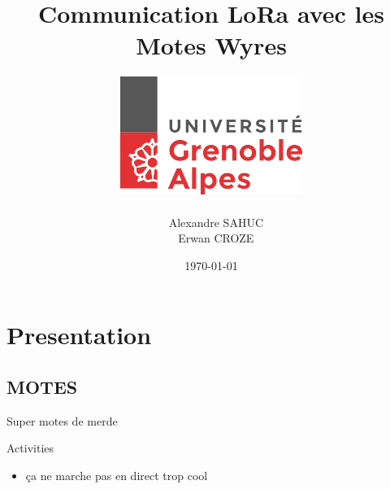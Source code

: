 \documentclass{beamer}
\title{Communication LoRa avec les Motes Wyres}
\author{\includegraphics[scale=0.3]{univ.png} \\~ \\ ~ Alexandre SAHUC\\~ Erwan CROZE}
\institute{Université Joseph Fourier \newline M2M}
\date{\today}
\begin{document}
\begin{frame}
	\titlepage
\end{frame}

\section{Presentation}
\subsection{MOTES}
\begin{frame}
  	\begin{block}{Super motes de merde}
		
	\end{block}
	
	\begin{exampleblock}{Activities}
		\begin{itemize}
			\item ça ne marche pas en direct trop cool
		\end{itemize}			
	\end{exampleblock}
\end{frame}
\end{document}
